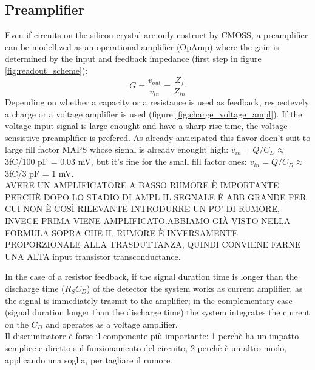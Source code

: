    \subsection{Preamplifier}
      Even if circuits on the silicon crystal are only costruct by CMOSS, a preamplifier can be modellized as an operational amplifier (OpAmp) where the gain is determined by the input and feedback impedance (first step in figure \ref{fig:readout_scheme}):
      \begin{equation}
         G = \frac{v_{out}}{v_{in}} = \frac{Z_{f}}{Z_{in}}
      \end{equation}
      Depending on whether a capacity or a resistance is used as feedback, respectevely a charge or a voltage amplifier is used (figure \ref{fig:charge_voltage_ampl}). If the voltage input signal is large enought and have a sharp rise time, the voltage sensistive preamplifier is prefered. As already anticipated this flavor doen't suit to large fill factor MAPS whose signal is already enought high: $v_{in} = Q/C_{D} \approx$ 3fC/100 pF = 0.03 mV, but it's fine for the small fill factor ones: $v_{in} = Q/C_{D} \approx$ 3fC/3 pF = 1 mV.\\
      AVERE UN AMPLIFICATORE A BASSO RUMORE È IMPORTANTE PERCHÈ DOPO LO STADIO DI AMPL IL SEGNALE È ABB GRANDE PER CUI NON È COSÌ RILEVANTE INTRODURRE UN PO' DI RUMORE, INVECE PRIMA VIENE AMPLIFICATO.ABBIAMO GIÀ VISTO NELLA FORMULA SOPRA CHE IL RUMORE È INVERSAMENTE PROPORZIONALE ALLA TRASDUTTANZA, QUINDI CONVIENE FARNE UNA ALTA input transistor transconductance.


      In the case of a resistor feedback, if the signal duration time is longer than the discharge time  ($R_S C_D$) of the detector the system works as current amplifier, as the signal is immediately trasmit to the amplifier; in the complementary case (signal duration longer than the discharge time) the system integrates the current on the $C_D$ and operates as a voltage amplifier.\\

      Il discriminatore è forse il componente più importante: 1 perchè ha un impatto semplice e diretto sul funzionamento del circuito, 2 perchè è un altro modo, applicando una soglia, per tagliare il rumore.

